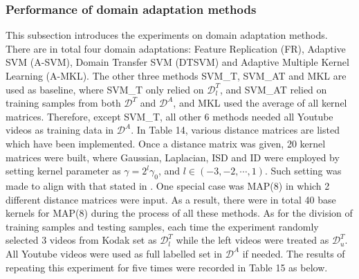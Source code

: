 \subsubsection{Performance of domain adaptation methods}
This subsection introduces the experiments on domain adaptation methods. There are in total four domain adaptations: Feature Replication (FR), Adaptive SVM (A-SVM), Domain Transfer SVM (DTSVM) and Adaptive Multiple Kernel Learning (A-MKL). The other three methods SVM\_T, SVM\_AT and MKL are used as baseline, where SVM\_T only relied on $\mathcal{D}_l^T$, and SVM\_AT relied on training samples from both $\mathcal{D}^T$ and $\mathcal{D}^A$, and MKL used the average of all kernel matrices. Therefore, except SVM\_T, all other 6 methods needed all Youtube videos as training data in $\mathcal{D}^A$. In Table 14, various distance matrices are listed which have been implemented. Once a distance matrix was given, 20 kernel matrices were built, where Gaussian, Laplacian, ISD and ID were employed by setting kernel parameter as $\gamma = 2^l \gamma_0$, and $l \in (-3, -2,\cdots, 1)$. Such setting was made to align with that stated in \cite{duan2012visual}. One special case was MAP(8) in which 2 different distance matrices were input. As a result, there were in total 40 base kernels for MAP(8) during the process of all these methods. As for the division of training samples and testing samples, each time the experiment randomly selected 3 videos from Kodak set as $\mathcal{D}_l^T$ while the left videos were treated as $\mathcal{D}_u^T$. All Youtube videos were used as full labelled set in $\mathcal{D}^A$ if needed. The results of repeating this experiment for five times were recorded in Table 15 as below.\\

